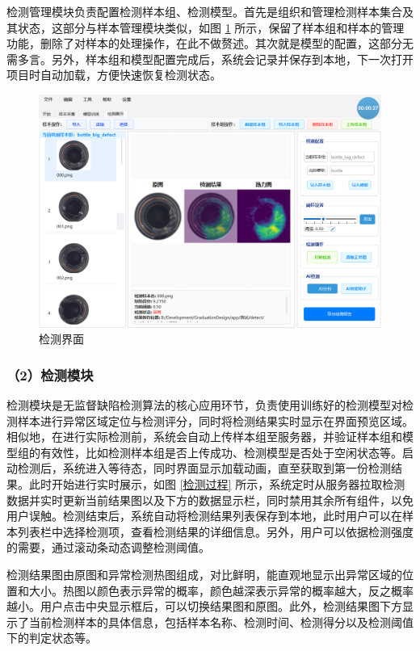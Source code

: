 \documentclass[
  ]{njuthesis}
\begin{document}
检测管理模块负责配置检测样本组、检测模型。首先是组织和管理检测样本集合及其状态，这部分与样本管理模块类似，如图 \ref{检测界面} 所示，保留了样本组和样本的管理功能，删除了对样本的处理操作，在此不做赘述。其次就是模型的配置，这部分无需多言。另外，样本组和模型配置完成后，系统会记录并保存到本地，下一次打开项目时自动加载，方便快速恢复检测状态。

\begin{figure}[htb]
    \centering
    \includegraphics[width=\textwidth]{images/检测界面.png}
    \caption{检测界面}
    \label{检测界面}
\end{figure}

\subsubsection{（2）检测模块}

检测模块是无监督缺陷检测算法的核心应用环节，负责使用训练好的检测模型对检测样本进行异常区域定位与检测评分，同时将检测结果实时显示在界面预览区域。相似地，在进行实际检测前，系统会自动上传样本组至服务器，并验证样本组和模型组的有效性，比如检测样本组是否上传成功、检测模型是否处于空闲状态等。启动检测后，系统进入等待态，同时界面显示加载动画，直至获取到第一份检测结果。此时开始进行实时展示，如图 \ref{检测过程} 所示，系统定时从服务器拉取检测数据并实时更新当前结果图以及下方的数据显示栏，同时禁用其余所有组件，以免用户误触。检测结束后，系统自动将检测结果列表保存到本地，此时用户可以在样本列表栏中选择检测项，查看检测结果的详细信息。另外，用户可以依据检测强度的需要，通过滚动条动态调整检测阈值。

检测结果图由原图和异常检测热图组成，对比鲜明，能直观地显示出异常区域的位置和大小。热图以颜色表示异常的概率，颜色越深表示异常的概率越大，反之概率越小。用户点击中央显示框后，可以切换结果图和原图。此外，检测结果图下方显示了当前检测样本的具体信息，包括样本名称、检测时间、检测得分以及检测阈值下的判定状态等。
\end{document}
